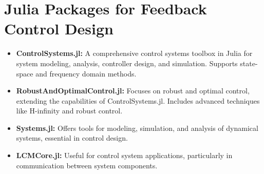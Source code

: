 \bigskip
\begin{center}
\setlength{\fboxrule}{2pt}  %
\end{center}
  
 \Qed

\section*{Julia Packages for Feedback Control Design}

\begin{itemize}
    \item \textbf{ControlSystems.jl:} A comprehensive control systems toolbox in Julia for system modeling, analysis, controller design, and simulation. Supports state-space and frequency domain methods.
    \item \textbf{RobustAndOptimalControl.jl:} Focuses on robust and optimal control, extending the capabilities of ControlSystems.jl. Includes advanced techniques like H-infinity and robust control.
    \item \textbf{Systems.jl:} Offers tools for modeling, simulation, and analysis of dynamical systems, essential in control design.
    \item \textbf{LCMCore.jl:} Useful for control system applications, particularly in communication between system components.
\end{itemize}




